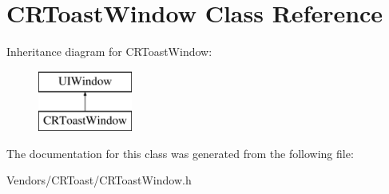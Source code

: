 \hypertarget{interface_c_r_toast_window}{}\section{C\+R\+Toast\+Window Class Reference}
\label{interface_c_r_toast_window}
Inheritance diagram for C\+R\+Toast\+Window\+:\begin{figure}[H]
\begin{center}
\leavevmode
\includegraphics[height=2.000000cm]{interface_c_r_toast_window}
\end{center}
\end{figure}


The documentation for this class was generated from the following file\+:\begin{DoxyCompactItemize}
\item 
Vendors/\+C\+R\+Toast/C\+R\+Toast\+Window.\+h\end{DoxyCompactItemize}
